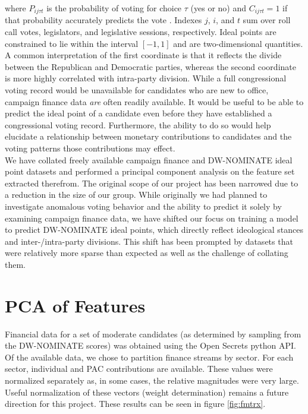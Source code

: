 \documentclass[10]{article}
\begin{document}
\noindent where $P_{ij \tau t}$ is the probability of voting for choice $\tau$ (yes or no) and $C_{ij \tau t} = 1$ if that probability accurately predicts the vote \cite{NOMBOOT}. Indexes $j$, $i$, and $t$ sum over roll call votes, legislators, and legislative sessions, respectively. Ideal points are constrained to lie within the interval $\left[ -1,1 \right]$ and are two-dimensional quantities. A common interpretation of the first coordinate is that it reflects the divide between the Republican and Democratic parties, whereas the second coordinate is more highly correlated with intra-party division. While a full congressional voting record would be unavailable for candidates who are new to office, campaign finance data \textit{are} often readily available. It would be useful to be able to predict the ideal point of a candidate even before they have established a congressional voting record. Furthermore, the ability to do so would help elucidate a relationship between monetary contributions to candidates and the voting patterns those contributions may effect.\\

We have collated freely available campaign finance and DW-NOMINATE ideal point \cite{DWWEB} datasets and performed a principal component analysis on the feature set extracted therefrom. The original scope of our project has been narrowed due to a reduction in the size of our group. While originally we had planned to investigate anomalous voting behavior and the ability to predict it solely by examining campaign finance data, we have shifted our focus on training a model to predict DW-NOMINATE ideal points, which directly reflect ideological stances and inter-/intra-party divisions. This shift has been prompted by datasets that were relatively more sparse than expected as well as the challenge of collating them.\\

\section*{PCA of Features}
Financial data for a set of moderate candidates (as determined by sampling from the DW-NOMINATE scores) was obtained using the Open Secrets python API.  Of the available data, we chose to partition finance streams by sector.  For each sector, individual and PAC contributions are available.  These values were normalized separately as, in some cases, the relative magnitudes were very large.  Useful normalization of these vectors (weight determination) remains a future direction for this project.  These results can be seen in figure \ref{fig:fmtrx}.
\end{document}
